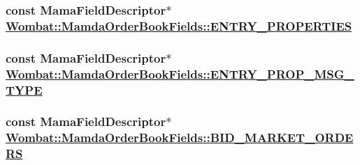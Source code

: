 \hypertarget{classWombat_1_1MamdaOrderBookFields_6b8fc3862dea588b764001ec2fc383ff}{
\subsubsection[ENTRY\_\-PROPERTIES]{\setlength{\rightskip}{0pt plus 5cm}const Mama\-Field\-Descriptor$\ast$ \hyperlink{classWombat_1_1MamdaOrderBookFields_6b8fc3862dea588b764001ec2fc383ff}{Wombat::Mamda\-Order\-Book\-Fields::ENTRY\_\-PROPERTIES}}}
\label{classWombat_1_1MamdaOrderBookFields_6b8fc3862dea588b764001ec2fc383ff}


\hypertarget{classWombat_1_1MamdaOrderBookFields_d622780a6082a84ffc347a7049b667a2}{
\subsubsection[ENTRY\_\-PROP\_\-MSG\_\-TYPE]{\setlength{\rightskip}{0pt plus 5cm}const Mama\-Field\-Descriptor$\ast$ \hyperlink{classWombat_1_1MamdaOrderBookFields_d622780a6082a84ffc347a7049b667a2}{Wombat::Mamda\-Order\-Book\-Fields::ENTRY\_\-PROP\_\-MSG\_\-TYPE}}}
\label{classWombat_1_1MamdaOrderBookFields_d622780a6082a84ffc347a7049b667a2}


\hypertarget{classWombat_1_1MamdaOrderBookFields_ffce12973e36788619433da8b886b489}{
\subsubsection[BID\_\-MARKET\_\-ORDERS]{\setlength{\rightskip}{0pt plus 5cm}const Mama\-Field\-Descriptor$\ast$ \hyperlink{classWombat_1_1MamdaOrderBookFields_ffce12973e36788619433da8b886b489}{Wombat::Mamda\-Order\-Book\-Fields::BID\_\-MARKET\_\-ORDERS}}}
\label{classWombat_1_1MamdaOrderBookFields_ffce12973e36788619433da8b886b489}


